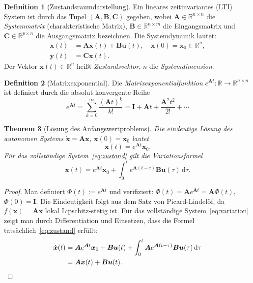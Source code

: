 ﻿\documentclass[12pt, a4paper, titlepage]{report}
\newtheorem{theorem}{Theorem}[section]
\theoremstyle{definition}
\newtheorem{definition}[theorem]{Definition}
\theoremstyle{remark}
\newcommand{\R}{\mathbb{R}}
\newcommand{\vx}{\bm{x}}
\newcommand{\vu}{\bm{u}}
\newcommand{\vy}{\bm{y}}
\newcommand{\vA}{\bm{A}}
\newcommand{\vB}{\bm{B}}
\newcommand{\vC}{\bm{C}}
\newcommand{\vI}{\bm{I}}
\begin{document}
\begin{definition}[Zustandsraumdarstellung]
\label{def:zrd}
Ein lineares zeitinvariantes (LTI) System ist durch das Tupel $(\vA, \vB, \vC)$ gegeben,
wobei $\vA \in \R^{n \times n}$ die \emph{Systemmatrix} (charakteristische Matrix),
$\vB \in \R^{n \times m}$ die Eingangsmatrix und $\vC \in \R^{p \times n}$ die
Ausgangsmatrix bezeichnen. Die Systemdynamik lautet:
\begin{align}
  \dot{\vx}(t) &= \vA\vx(t) + \vB\vu(t), \quad \vx(0) = \vx_0 \in \R^n,
    \label{eq:zustand} \\
  \vy(t) &= \vC\vx(t). \label{eq:ausgang}
\end{align}
Der Vektor $\vx(t) \in \R^n$ heißt \emph{Zustandsvektor}, $n$ die
\emph{Systemdimension}.
\end{definition}

\begin{definition}[Matrixexponential]
\label{def:matexp}
Die \emph{Matrixexponentialfunktion} $e^{\vA t} : \R \to \R^{n \times n}$ ist definiert
durch die absolut konvergente Reihe
\begin{equation}
  e^{\vA t} = \sum_{k=0}^{\infty} \frac{(\vA t)^k}{k!} = \vI + \vA t + \frac{\vA^2 t^2}{2!} + \cdots
  \label{eq:matexp}
\end{equation}
\end{definition}

\begin{theorem}[Lösung des Anfangswertproblems]
\label{thm:loesung}
Die eindeutige Lösung des autonomen Systems $\dot{\vx} = \vA\vx$,
$\vx(0) = \vx_0$ lautet
\begin{equation}
  \vx(t) = e^{\vA t}\vx_0.
  \label{eq:loesung}
\end{equation}
Für das vollständige System~\eqref{eq:zustand} gilt die Variationsformel
\begin{equation}
  \vx(t) = e^{\vA t}\vx_0 + \int_0^t e^{\vA(t-\tau)}\vB\vu(\tau)\,\mathrm{d}\tau.
  \label{eq:variation}
\end{equation}
\end{theorem}

\begin{proof}
Man definiert $\Phi(t) := e^{\vA t}$ und verifiziert:
$\dot{\Phi}(t) = \vA e^{\vA t} = \vA\Phi(t)$, $\Phi(0) = \vI$.
Die Eindeutigkeit folgt aus dem Satz von Picard-Lindelöf, da $f(\vx) = \vA\vx$ lokal
Lipschitz-stetig ist. Für das vollständige System~\eqref{eq:variation} zeigt man
durch Differentiation und Einsetzen, dass die Formel tatsächlich~\eqref{eq:zustand}
erfüllt:
\begin{align*}
  \dot{\vx}(t) &= \vA e^{\vA t}\vx_0 + \vB\vu(t) + \int_0^t \vA e^{\vA(t-\tau)}\vB\vu(\tau)\,\mathrm{d}\tau \\
               &= \vA\vx(t) + \vB\vu(t). \qedhere
\end{align*}
\end{proof}
\end{document}
